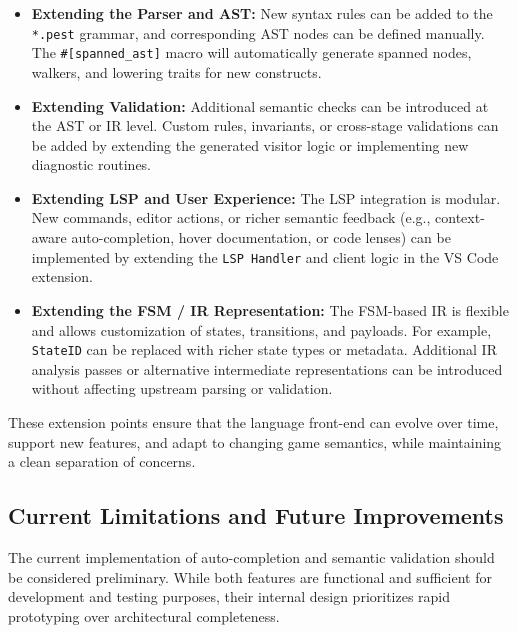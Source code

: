 \documentclass[a4paper,11pt]{article}
\begin{document}
\begin{itemize}
    \item \textbf{Extending the Parser and AST:}  
          New syntax rules can be added to the \texttt{*.pest} grammar,
          and corresponding AST nodes can be defined manually.  
          The \texttt{\#[spanned\_ast]} macro will automatically
          generate spanned nodes, walkers, and lowering traits for new constructs.

    \item \textbf{Extending Validation:}  
          Additional semantic checks can be introduced at the AST or IR level.
          Custom rules, invariants, or cross-stage validations can be added
          by extending the generated visitor logic or implementing new diagnostic
          routines.

    \item \textbf{Extending LSP and User Experience:}  
          The LSP integration is modular. New commands, editor actions,
          or richer semantic feedback (e.g., context-aware auto-completion,
          hover documentation, or code lenses) can be implemented by extending
          the \texttt{LSP Handler} and client logic in the VS Code extension.

    \item \textbf{Extending the FSM / IR Representation:}  
          The FSM-based IR is flexible and allows customization of states,
          transitions, and payloads. For example, \texttt{StateID} can be
          replaced with richer state types or metadata. Additional IR analysis
          passes or alternative intermediate representations can be introduced
          without affecting upstream parsing or validation.
\end{itemize}

These extension points ensure that the language front-end can evolve
over time, support new features, and adapt to changing game semantics,
while maintaining a clean separation of concerns.

\subsection{Current Limitations and Future Improvements}

The current implementation of auto-completion and semantic validation should be considered preliminary.
While both features are functional and sufficient for development and testing purposes, their internal
design prioritizes rapid prototyping over architectural completeness.
\end{document}
